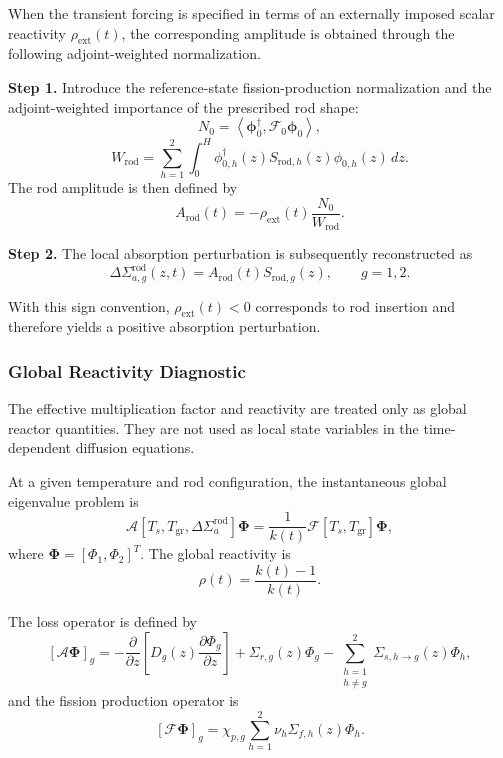 \documentclass[a4paper,12pt]{article}
\begin{document}
When the transient forcing is specified in terms of an externally imposed
scalar reactivity $\rho_{\mathrm{ext}}(t)$, the corresponding amplitude is
obtained through the following adjoint-weighted normalization.

\noindent\textbf{Step 1.}
Introduce the reference-state fission-production normalization and the
adjoint-weighted importance of the prescribed rod shape:
\[
N_0
=
\left\langle
\boldsymbol{\phi}_{0}^{\dagger},
\mathcal{F}_{0}\boldsymbol{\phi}_{0}
\right\rangle,
\]
\[
W_{\mathrm{rod}}
=
\sum_{h=1}^{2}
\int_{0}^{H}
\phi_{0,h}^{\dagger}(z)
S_{\mathrm{rod},h}(z)
\phi_{0,h}(z)\,dz.
\]
The rod amplitude is then defined by
\[
A_{\mathrm{rod}}(t)
=
-
\rho_{\mathrm{ext}}(t)
\frac{N_0}{W_{\mathrm{rod}}}.
\]

\noindent\textbf{Step 2.}
The local absorption perturbation is subsequently reconstructed as
\begin{equation}
\Delta\Sigma_{a,g}^{\mathrm{rod}}(z,t)
=
A_{\mathrm{rod}}(t)S_{\mathrm{rod},g}(z),
\qquad
g=1,2.
\label{eq:rho_to_absorption}
\end{equation}

With this sign convention, $\rho_{\mathrm{ext}}(t)<0$ corresponds to rod
insertion and therefore yields a positive absorption perturbation.

\subsubsection{Global Reactivity Diagnostic}

The effective multiplication factor and reactivity are treated only as
global reactor quantities. They are not used as local state variables in the
time-dependent diffusion equations.

At a given temperature and rod configuration, the instantaneous global
eigenvalue problem is
\begin{equation}
\mathcal{A}
\left[
T_s,T_{\mathrm{gr}},\Delta\Sigma_{a}^{\mathrm{rod}}
\right]
\boldsymbol{\Phi}
=
\frac{1}{k(t)}
\mathcal{F}
\left[
T_s,T_{\mathrm{gr}}
\right]
\boldsymbol{\Phi},
\label{eq:global_eigenvalue}
\end{equation}
where $\boldsymbol{\Phi}=[\Phi_1,\Phi_2]^T$. The global reactivity is
\begin{equation}
\rho(t)=\frac{k(t)-1}{k(t)}.
\label{eq:global_reactivity}
\end{equation}

The loss operator is defined by
\begin{equation}
\left[
\mathcal{A}\boldsymbol{\Phi}
\right]_g
=
-
\frac{\partial}{\partial z}
\left[
D_g(z)
\frac{\partial \Phi_g}{\partial z}
\right]
+
\Sigma_{r,g}(z)\Phi_g
-
\sum_{\substack{h=1\\h\neq g}}^{2}
\Sigma_{s,h\rightarrow g}(z)\Phi_h,
\label{eq:loss_operator}
\end{equation}
and the fission production operator is
\begin{equation}
\left[
\mathcal{F}\boldsymbol{\Phi}
\right]_g
=
\chi_{p,g}
\sum_{h=1}^{2}
\nu_h\Sigma_{f,h}(z)\Phi_h.
\label{eq:fission_operator}
\end{equation}
\end{document}
